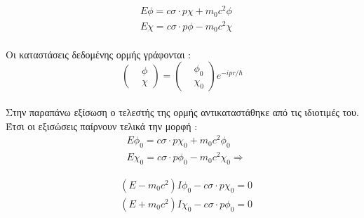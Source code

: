 \begin{equation*}
  \begin{split}
    &E\phi = c \sigma \cdot p \chi+ m_0 c^2 \phi\\ 
    &E\chi = c \sigma \cdot p \phi- m_0 c^2 \chi 
  \end{split}
\end{equation*}\\
Οι καταστάσεις δεδομένης ορμής γράφονται : 
\begin{equation*}
  \begin{pmatrix}
    &\phi\\
    &\chi
  \end{pmatrix}
  = 
  \begin{pmatrix}
    &\phi_0\\
    &\chi_0
  \end{pmatrix} 
 e^{-ipr/\hbar }
\end{equation*}\\
Στην παραπάνω εξίσωση ο τελεστής της ορμής αντικαταστάθηκε από τις ιδιοτιμές του. Έτσι οι εξισώσεις παίρνουν τελικά την μορφή : \\
\begin{equation*}
  \begin{split}
    &E\phi_0 = c \sigma \cdot p \chi_0+ m_0 c^2 \phi_0\\ 
    &E\chi_0 = c \sigma \cdot p \phi_0- m_0 c^2 \chi_0  \Rightarrow
  \end{split}
\end{equation*}

\begin{equation}
  \begin{split}
    &(E-m_0c^2)I\phi_0 - c \sigma \cdot p \chi_0 = 0 \\ 
    &(E+m_0 c^2)I\chi_0 - c \sigma \cdot p \phi_0 = 0 
    \label{somedireq}
  \end{split}
\end{equation}

